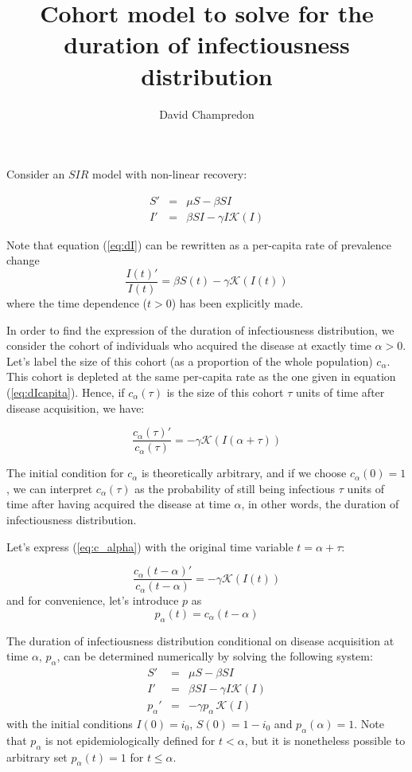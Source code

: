 \documentclass[12pt, twocolumn]{article}   	%
\title{Cohort model to solve for the duration of infectiousness distribution }
\author{David Champredon}
\newcommand{\K}{\mathcal{K}}
\newcommand{\eqref}[1]{(\ref{#1})}
\begin{document}
\maketitle

Consider an $SIR$ model with non-linear recovery:

\begin{eqnarray}
S' & = & \mu S - \beta SI \\
I' & = & \beta S I - \gamma I \K(I) \label{eq:dI}
\end{eqnarray}

Note that equation \eqref{eq:dI} can be rewritten as a per-capita rate of prevalence change
\begin{equation}
\frac{I(t)'}{I(t)}  =  \beta S(t)  - \gamma \K(I(t)) \label{eq:dIcapita}
\end{equation}
where the time dependence ($t>0$) has been explicitly made.

In order to find the expression of the duration of infectiousness distribution, we consider the cohort of individuals who acquired the disease at exactly time $\alpha>0$. Let's label the size of this cohort (as a proportion of the whole population) $c_\alpha$. This cohort is depleted at the same per-capita rate as the one given in equation \eqref{eq:dIcapita}. Hence, if $c_\alpha(\tau)$ is the size of this cohort $\tau$ units of time after disease acquisition, we have:

\begin{equation}
\frac{c_\alpha(\tau)'}{c_\alpha(\tau)}  =   - \gamma \K(I(\alpha+\tau)) \label{eq:c_alpha}
\end{equation}

The initial condition for $c_\alpha$ is theoretically arbitrary, and if we choose $c_\alpha(0)=1$, we can interpret $c_\alpha(\tau)$ as the probability of still being infectious $\tau$ units of time after having acquired the disease at time $\alpha$, in other words, the duration of infectiousness distribution.

Let's express \eqref{eq:c_alpha} with the original time variable $t = \alpha+\tau$:

\begin{equation}
\frac{c_\alpha(t-\alpha)'}{c_\alpha(t-\alpha)}  =   - \gamma \K(I(t)) \label{eq:c_alpha_t}
\end{equation}
and for convenience, let's introduce $p$ as
$$p_\alpha(t) = c_\alpha(t-\alpha)$$


The duration of infectiousness distribution conditional on disease acquisition at time $\alpha$, $p_\alpha$, can be determined numerically by solving the following system:
\begin{eqnarray}
S' & = & \mu S - \beta SI \\
I' & = & \beta S I - \gamma I \K(I)\\ 
p_\alpha' & = & - \gamma p_\alpha\, \K(I) 
\end{eqnarray}
with the initial conditions $I(0) = i_0$, $S(0)=1-i_0$ and $p_\alpha(\alpha)=1$. Note that $p_\alpha$ is not epidemiologically defined for $t<\alpha$, but it is nonetheless possible to arbitrary set $p_\alpha(t)=1$ for $t\leq \alpha$.
\end{document}
